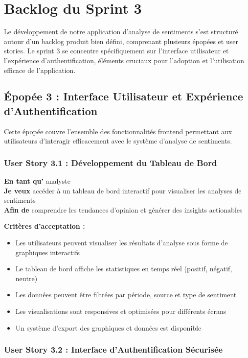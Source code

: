 \section{Backlog du Sprint 3}

Le développement de notre application d'analyse de sentiments s'est structuré autour d'un backlog produit bien défini, comprenant plusieurs épopées et user stories. Le sprint 3 se concentre spécifiquement sur l'interface utilisateur et l'expérience d'authentification, éléments cruciaux pour l'adoption et l'utilisation efficace de l'application.

\subsection{Épopée 3 : Interface Utilisateur et Expérience d'Authentification}

Cette épopée couvre l'ensemble des fonctionnalités frontend permettant aux utilisateurs d'interagir efficacement avec le système d'analyse de sentiments.

\subsubsection{User Story 3.1 : Développement du Tableau de Bord}

\textbf{En tant qu'} analyste \\
\textbf{Je veux} accéder à un tableau de bord interactif pour visualiser les analyses de sentiments \\
\textbf{Afin de} comprendre les tendances d'opinion et générer des insights actionables

\textbf{Critères d'acceptation :}
\begin{itemize}
    \item Les utilisateurs peuvent visualiser les résultats d'analyse sous forme de graphiques interactifs
    \item Le tableau de bord affiche les statistiques en temps réel (positif, négatif, neutre)
    \item Les données peuvent être filtrées par période, source et type de sentiment
    \item Les visualisations sont responsives et optimisées pour différents écrans
    \item Un système d'export des graphiques et données est disponible
\end{itemize}

\subsubsection{User Story 3.2 : Interface d'Authentification Sécurisée}

